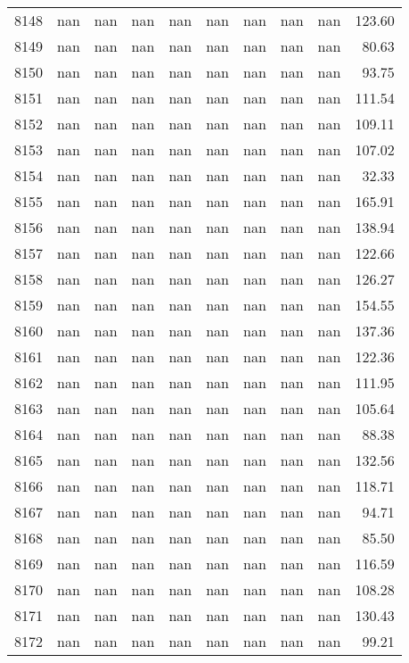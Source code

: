 \begin{tabular}{lrrrrrrrrr}
8148 & nan & nan & nan & nan & nan & nan & nan & nan & 123.60 \\
8149 & nan & nan & nan & nan & nan & nan & nan & nan & 80.63 \\
8150 & nan & nan & nan & nan & nan & nan & nan & nan & 93.75 \\
8151 & nan & nan & nan & nan & nan & nan & nan & nan & 111.54 \\
8152 & nan & nan & nan & nan & nan & nan & nan & nan & 109.11 \\
8153 & nan & nan & nan & nan & nan & nan & nan & nan & 107.02 \\
8154 & nan & nan & nan & nan & nan & nan & nan & nan & 32.33 \\
8155 & nan & nan & nan & nan & nan & nan & nan & nan & 165.91 \\
8156 & nan & nan & nan & nan & nan & nan & nan & nan & 138.94 \\
8157 & nan & nan & nan & nan & nan & nan & nan & nan & 122.66 \\
8158 & nan & nan & nan & nan & nan & nan & nan & nan & 126.27 \\
8159 & nan & nan & nan & nan & nan & nan & nan & nan & 154.55 \\
8160 & nan & nan & nan & nan & nan & nan & nan & nan & 137.36 \\
8161 & nan & nan & nan & nan & nan & nan & nan & nan & 122.36 \\
8162 & nan & nan & nan & nan & nan & nan & nan & nan & 111.95 \\
8163 & nan & nan & nan & nan & nan & nan & nan & nan & 105.64 \\
8164 & nan & nan & nan & nan & nan & nan & nan & nan & 88.38 \\
8165 & nan & nan & nan & nan & nan & nan & nan & nan & 132.56 \\
8166 & nan & nan & nan & nan & nan & nan & nan & nan & 118.71 \\
8167 & nan & nan & nan & nan & nan & nan & nan & nan & 94.71 \\
8168 & nan & nan & nan & nan & nan & nan & nan & nan & 85.50 \\
8169 & nan & nan & nan & nan & nan & nan & nan & nan & 116.59 \\
8170 & nan & nan & nan & nan & nan & nan & nan & nan & 108.28 \\
8171 & nan & nan & nan & nan & nan & nan & nan & nan & 130.43 \\
8172 & nan & nan & nan & nan & nan & nan & nan & nan & 99.21 \\

\end{tabular}
